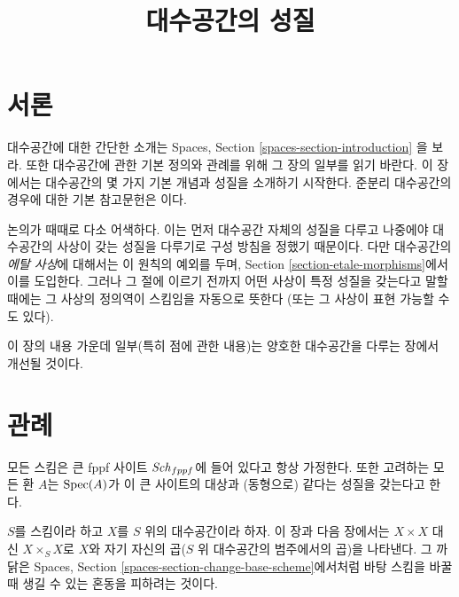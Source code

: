 

%


\title{대수공간의 성질}


\maketitle

\label{section-phantom}

\tableofcontents

\section{서론}
\label{section-introduction}

\noindent
대수공간에 대한 간단한 소개는
Spaces, Section \ref{spaces-section-introduction}
을 보라. 또한 대수공간에 관한 기본 정의와 관례를 위해 그 장의
일부를 읽기 바란다. 이 장에서는 대수공간의 몇 가지 기본 개념과
성질을 소개하기 시작한다. 준분리 대수공간의 경우에 대한 기본
참고문헌은 \cite{Kn} 이다.

\medskip\noindent
논의가 때때로 다소 어색하다. 이는 먼저 대수공간 자체의 성질을
다루고 나중에야 대수공간의 사상이 갖는 성질을 다루기로
구성 방침을 정했기 때문이다. 다만 대수공간의
{\it 에탈 사상}에 대해서는 이 원칙의 예외를 두며, Section
\ref{section-etale-morphisms}에서 이를 도입한다.
그러나 그 절에 이르기 전까지 어떤 사상이 특정 성질을 갖는다고
말할 때에는 그 사상의 정의역이 스킴임을 자동으로 뜻한다
(또는 그 사상이 표현 가능할 수도 있다).

\medskip\noindent
이 장의 내용 가운데 일부(특히 점에 관한 내용)는
양호한 대수공간을 다루는 장에서 개선될 것이다.


\section{관례}
\label{section-conventions}

\noindent
모든 스킴은 큰 fppf 사이트 $\mathit{Sch}_{fppf}$에 들어 있다고
항상 가정한다. 또한 고려하는 모든 환 $A$는 $\mathop{\mathrm{Spec}}(A)$가
이 큰 사이트의 대상과 (동형으로) 같다는 성질을 갖는다고 한다.

\medskip\noindent
$S$를 스킴이라 하고 $X$를 $S$ 위의 대수공간이라 하자.
이 장과 다음 장에서는 $X \times X$ 대신 $X \times_S X$로
$X$와 자기 자신의 곱($S$ 위 대수공간의 범주에서의 곱)을
나타낸다. 그 까닭은 Spaces, Section
\ref{spaces-section-change-base-scheme}에서처럼 바탕 스킴을
바꿀 때 생길 수 있는 혼동을 피하려는 것이다.



